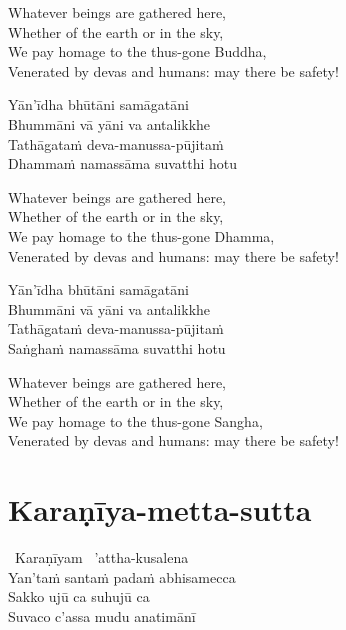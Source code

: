 \begin{english-verses}
  Whatever beings are gathered here,\\
  Whether of the earth or in the sky,\\
  We pay homage to the thus-gone Buddha,\\
  Venerated by devas and humans: may there be safety!
\end{english-verses}

\begin{pali-hang-continued}
  Yān'īdha bhūtāni samāgatāni\\
  Bhummāni vā yāni va antalikkhe\\
  Tathāgataṁ deva-manussa-pūjitaṁ\\
  Dhammaṁ namassāma suvatthi hotu
\end{pali-hang-continued}

\begin{english-verses}
  Whatever beings are gathered here,\\
  Whether of the earth or in the sky,\\
  We pay homage to the thus-gone Dhamma,\\
  Venerated by devas and humans: may there be safety!
\end{english-verses}

\begin{pali-hang-continued}
  Yān'īdha bhūtāni samāgatāni\\
  Bhummāni vā yāni va antalikkhe\\
  Tathāgataṁ deva-manussa-pūjitaṁ\\
  Saṅghaṁ namassāma suvatthi hotu
\end{pali-hang-continued}

\begin{english-verses}
  Whatever beings are gathered here,\\
  Whether of the earth or in the sky,\\
  We pay homage to the thus-gone Sangha,\\
  Venerated by devas and humans: may there be safety!
\end{english-verses}

\suttaRef{[Snp 2.1]}

\section{Karaṇīya-metta-sutta}
\label{karaniya-metta-sutta}

\begin{pali-hangtogether}
  \anglebracketleft\ \hspace{-0.5mm}Karaṇīyam \hspace{-0.5mm}\anglebracketright\ 'attha-kusalena\\
  Yan'taṁ santaṁ padaṁ abhisamecca\\
  Sakko ujū ca suhujū ca\\
  Suvaco c'assa mudu anatimānī
\end{pali-hangtogether}

